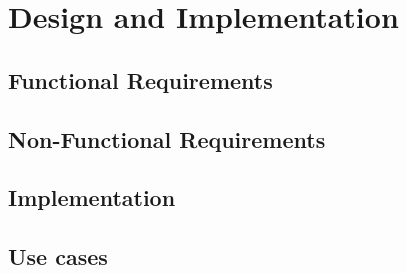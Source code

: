 
\chapter{Design and Implementation} %

\label{Chapter5} %


\par 

\par 


\section{Functional Requirements}

\par 

\section{Non-Functional Requirements}

\par 

\section{Implementation}

\par

\section{Use cases}

